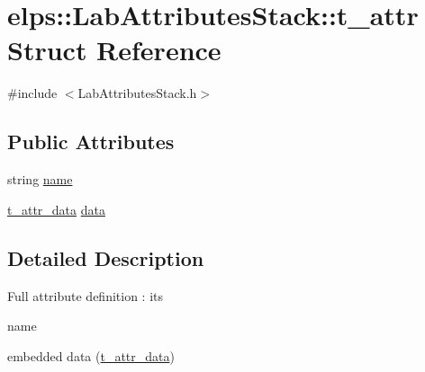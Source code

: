 \hypertarget{structelps_1_1_lab_attributes_stack_1_1t__attr}{\section{elps\-:\-:Lab\-Attributes\-Stack\-:\-:t\-\_\-attr Struct Reference}
\label{structelps_1_1_lab_attributes_stack_1_1t__attr}
}


{\ttfamily \#include $<$Lab\-Attributes\-Stack.\-h$>$}

\subsection*{Public Attributes}
\begin{DoxyCompactItemize}
\item 
string \hyperlink{structelps_1_1_lab_attributes_stack_1_1t__attr_a6081ff65525e6e2895c72903da219803}{name}
\item 
\hyperlink{structelps_1_1_lab_attributes_stack_1_1t__attr__data}{t\-\_\-attr\-\_\-data} \hyperlink{structelps_1_1_lab_attributes_stack_1_1t__attr_a40f2a6b918faf72d03a62ce77e3a017c}{data}
\end{DoxyCompactItemize}


\subsection{Detailed Description}
Full attribute definition \-: its
\begin{DoxyItemize}
\item name
\item embedded data (\hyperlink{structelps_1_1_lab_attributes_stack_1_1t__attr__data}{t\-\_\-attr\-\_\-data}) 
\end{DoxyItemize}

